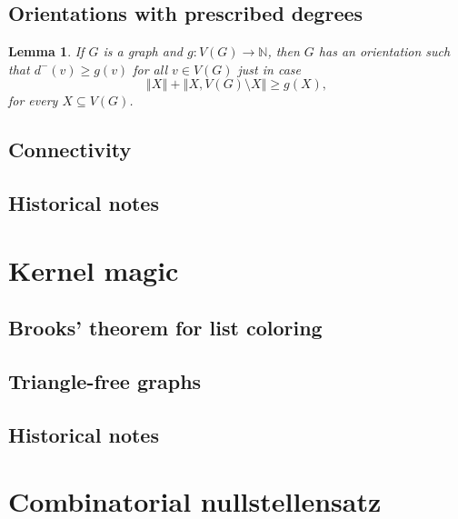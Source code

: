 \documentclass[openany]{tufte-book} %
\theoremstyle{plain}
\newtheorem{lemma}{Lemma}
\newcommand{\size}[1]{\left\Vert#1\right\Vert}
\newcommand{\func}[3]{#1\colon #2 \rightarrow #3}
\newcommand{\IN}{\mathbb{N}}
\begin{document}
\section{Orientations with prescribed degrees}
\begin{lemma}\label{InOrientations} If $G$ is a graph and $\func{g}{V(G)}{\IN}$,
then $G$ has an orientation such that $d^{-}(v)\ge g(v)$ for all $v\in V(G)$ just in case
\[
\size{X}+\size{X,V(G)\setminus X}\ge g(X),
\]
for every $X \subseteq V(G)$.
\end{lemma}

\section{Connectivity}
\section{Historical notes}

\chapter{Kernel magic}
\section{Brooks' theorem for list coloring}
\section{Triangle-free graphs}
\section{Historical notes}

\chapter{Combinatorial nullstellensatz}
\end{document}
